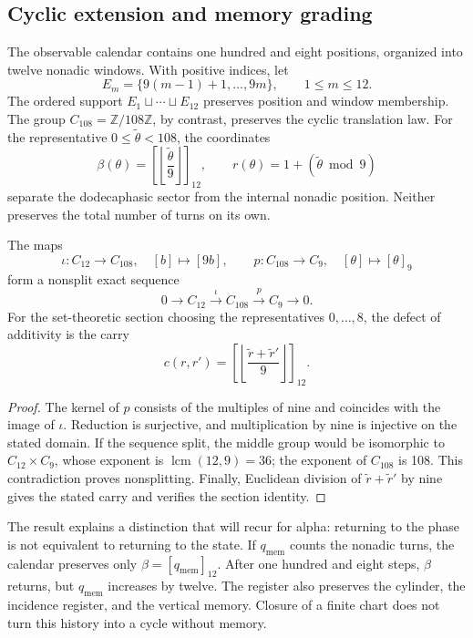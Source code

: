 

\subsection{Cyclic extension and memory grading}
\label{subsec:k-calendario}

The observable calendar contains one hundred and eight positions, organized into
twelve nonadic windows. With positive indices, let
\[
 E_m=\{9(m-1)+1,\ldots,9m\},\qquad 1\leq m\leq12.
\]
The ordered support \(E_1\sqcup\cdots\sqcup E_{12}\) preserves position and
window membership. The group \(C_{108}=\mathbb Z/108\mathbb Z\),
by contrast, preserves the cyclic translation law. For the representative
\(0\leq\widetilde\theta<108\), the coordinates
\[
 \beta(\theta)=\left[\left\lfloor\frac{\widetilde\theta}{9}\right\rfloor\right]_{12},
 \qquad r(\theta)=1+(\widetilde\theta\bmod9)
\]
separate the dodecaphasic sector from the internal nonadic position. Neither
preserves the total number of turns on its own.

\begin{proposition}
\label{prop:k-extension}
The maps
\[
 \iota:C_{12}\longrightarrow C_{108},\quad[b]\longmapsto[9b],
 \qquad p:C_{108}\longrightarrow C_9,\quad[\theta]\longmapsto[\theta]_9
\]
form a nonsplit exact sequence
\[
 0\longrightarrow C_{12}\xrightarrow{\iota}C_{108}
 \xrightarrow{p}C_9\longrightarrow0.
\]
For the set-theoretic section choosing the representatives
\(0,\ldots,8\), the defect of additivity is the carry
\[
 c(r,r')=\left[\left\lfloor\frac{\widetilde r+\widetilde r'}9\right\rfloor\right]_{12}.
\]
\end{proposition}

\begin{proof}
The kernel of \(p\) consists of the multiples of nine and coincides with
the image of \(\iota\). Reduction is surjective, and multiplication
by nine is injective on the stated domain. If the sequence
split, the middle group would be isomorphic to \(C_{12}\times C_9\), whose
exponent is \(\operatorname{lcm}(12,9)=36\); the exponent of
\(C_{108}\) is 108. This contradiction proves nonsplitting. Finally,
Euclidean division of \(\widetilde r+\widetilde r'\) by nine gives the
stated carry and verifies the section identity.
\end{proof}

The result explains a distinction that will recur for alpha: returning to the
phase is not equivalent to returning to the state. If \(q_{\mathrm{mem}}\) counts the
nonadic turns, the calendar preserves only
\(\beta=[q_{\mathrm{mem}}]_{12}\). After one hundred and eight steps,
\(\beta\) returns, but \(q_{\mathrm{mem}}\) increases by twelve. The
register also preserves the cylinder, the incidence register, and the vertical
memory. Closure of a finite chart does not turn this history into a
cycle without memory.

